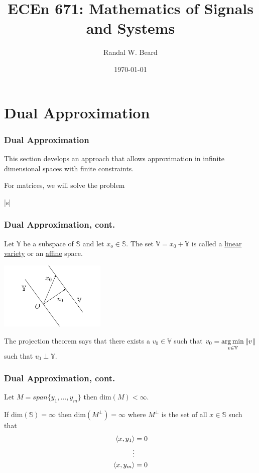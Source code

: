 \documentclass{beamer}
\title{ECEn 671: Mathematics of Signals and Systems}
\author{Randal W. Beard}
\institute{Brigham Young University}
\date{\today}
\begin{document}
\begin{frame}
	\titlepage
\end{frame}


\section{Dual Approximation}
\frame{\sectionpage}

\begin{frame}\frametitle{Dual Approximation}
	This section develops an approach that allows approximation in infinite dimensional spaces with finite constraints.
	
	\vfill
	
	For matrices, we will solve the problem
	\begin{mini*}|s|
	{}{}{}{}
	\end{mini*}
\end{frame}

\begin{frame}\frametitle{Dual Approximation, cont.}
\begin{definition}
	Let $\mathbb{Y}$ be a subspace of $\mathbb{S}$ and let $x_o \in \mathbb{S}$.  The set $\mathbb{V} = x_0 + \mathbb{Y}$ is called a \underline{linear variety} or an \underline{affine} space.
	\begin{center}
	\includegraphics[width=2in]{figures/chap3_affine_space}
	\end{center}
\end{definition}
	
	The projection theorem says that there exists a $v_0 \in \mathbb{V}$ such that
	$v_0 = \underset{v \in \mathbb{V}}{\arg\min}\left\| v \right\|$ such that
	$v_0 \perp \mathbb{Y}$.

\end{frame}

\begin{frame}\frametitle{Dual Approximation, cont.}
	Let $M = span\{y_1, \ldots, y_m\}$ then $\text{dim}(M) < \infty$.
	
	\vfill
	
	If $\text{dim}(\mathbb{S}) = \infty$ then $\text{dim}(M^{\perp}) = \infty$ where $M^{\perp}$ is the set of all $x \in \mathbb{S}$ such that
	\begin{align*}
	\left<x, y_1\right> &= 0 \\
	\vdots \\
	\left<x, y_m\right> &=0	
	\end{align*}
\end{frame}
\end{document}
